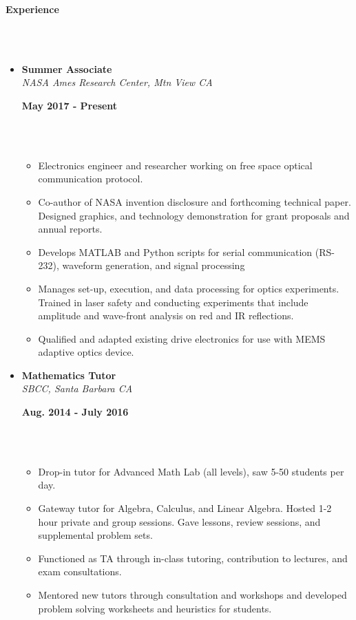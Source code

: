 \documentclass[a4paper,11pt]{article}
\newcommand{\isep}{-2 pt}
\newcommand{\lsep}{-0.2cm}
\newcommand{\resheading}[1]{{\small \colorbox{mygrey}{\begin{minipage}{0.975\textwidth}{\textbf{#1 \vphantom{p\^{E}}}}\end{minipage}}}}
\newcommand{\workexp}[4]{
\begin{minipage}[t]{7cm}
\begin{flushleft}
\textbf{#1} \\
\indent \emph{#2}\\
\end{flushleft}
\end{minipage}
\hfill
\begin{minipage}[t]{7cm}
\begin{flushright}
\textbf{#3} \\
\indent #4 \\
\end{flushright}
\end{minipage}
}
\begin{document}



\resheading{\textbf{Experience} }\\[\lsep]
\\[-0.5cm]
\begin{itemize}
\item 
\workexp{Summer Associate}{NASA Ames Research Center, Mtn View CA}{May 2017 - Present}{}
\\[-0.3cm]
	\begin{itemize}\itemsep \isep
	\item Electronics engineer and researcher working on free space optical communication protocol.
	\item Co-author of NASA invention disclosure and forthcoming technical paper. Designed graphics, and technology demonstration for grant proposals and annual reports.
	\item Develops MATLAB and Python scripts for serial communication (RS-232), waveform generation, and signal processing
	\item Manages set-up, execution, and data processing for optics experiments. Trained in laser safety and conducting experiments that include amplitude and wave-front analysis on red and IR reflections. 
	\item Qualified and adapted existing drive electronics for use with MEMS adaptive optics device.
	
	\end{itemize}
	
\item 
\workexp{Mathematics Tutor}{SBCC, Santa Barbara CA}{Aug. 2014 - July 2016}{}
\\[-0.3cm]
	\begin{itemize}\itemsep \isep
	\item Drop-in tutor for Advanced Math Lab (all levels), saw 5-50 students per day.
	\item Gateway tutor for Algebra, Calculus, and Linear Algebra. Hosted 1-2 hour private and group sessions. Gave lessons, review sessions, and supplemental problem sets.
	\item Functioned as TA through in-class tutoring, contribution to lectures, and exam consultations.
	\item Mentored new tutors through consultation and workshops and developed problem solving worksheets and heuristics for students.
	\end{itemize}


\end{itemize}
\end{document}
